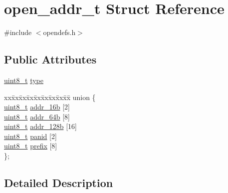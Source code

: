 \hypertarget{structopen__addr__t}{}\section{open\+\_\+addr\+\_\+t Struct Reference}
\label{structopen__addr__t}


{\ttfamily \#include $<$opendefs.\+h$>$}

\subsection*{Public Attributes}
\begin{DoxyCompactItemize}
\item 
\hyperlink{_p_e___types_8h_aba7bc1797add20fe3efdf37ced1182c5}{uint8\+\_\+t} \hyperlink{structopen__addr__t_a2abdbb15dedda5606521852a4b4fc0ba}{type}
\item 
\begin{tabbing}
xx\=xx\=xx\=xx\=xx\=xx\=xx\=xx\=xx\=\kill
union \{\\
\>\hyperlink{_p_e___types_8h_aba7bc1797add20fe3efdf37ced1182c5}{uint8\_t} \hyperlink{structopen__addr__t_afa50fc2bde5b1261a09666c75aeecc55}{addr\_16b} \mbox{[}2\mbox{]}\\
\>\hyperlink{_p_e___types_8h_aba7bc1797add20fe3efdf37ced1182c5}{uint8\_t} \hyperlink{structopen__addr__t_a7ca9b0c966447d191c6f05e375571231}{addr\_64b} \mbox{[}8\mbox{]}\\
\>\hyperlink{_p_e___types_8h_aba7bc1797add20fe3efdf37ced1182c5}{uint8\_t} \hyperlink{structopen__addr__t_aa63d537d10bdd6d1a50a6d302a5e1817}{addr\_128b} \mbox{[}16\mbox{]}\\
\>\hyperlink{_p_e___types_8h_aba7bc1797add20fe3efdf37ced1182c5}{uint8\_t} \hyperlink{structopen__addr__t_aee6c05ab606841e1fa6a918103abd995}{panid} \mbox{[}2\mbox{]}\\
\>\hyperlink{_p_e___types_8h_aba7bc1797add20fe3efdf37ced1182c5}{uint8\_t} \hyperlink{structopen__addr__t_a026c06dfd492ddbde8e4d4254fd35ce3}{prefix} \mbox{[}8\mbox{]}\\
\}; \\

\end{tabbing}\end{DoxyCompactItemize}


\subsection{Detailed Description}


